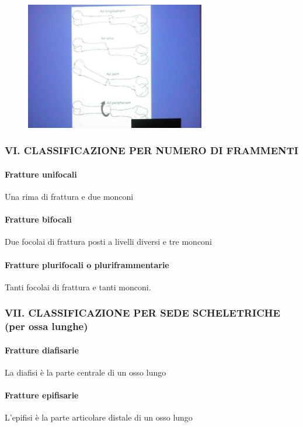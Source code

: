 \begin{figure}[!ht]
\centering
\includegraphics[width=0.7\textwidth]{002/image6.png}
\end{figure}


\subsubsection{VI. CLASSIFICAZIONE PER NUMERO DI FRAMMENTI}

\paragraph{Fratture unifocali}
Una rima di frattura e due monconi
\paragraph{Fratture bifocali} 
Due focolai di frattura posti a livelli diversi e tre monconi
\paragraph{Fratture plurifocali o pluriframmentarie} Tanti focolai di frattura e tanti monconi.


\subsubsection{VII. CLASSIFICAZIONE PER SEDE SCHELETRICHE (per ossa lunghe)}

\paragraph{Fratture diafisarie}
La diafisi è la parte centrale di un osso lungo
\paragraph{Fratture epifisarie} 
L'epifisi è la parte articolare distale di un osso lungo
